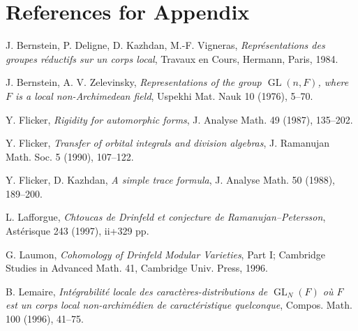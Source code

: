 \documentclass[10pt]{article}
\newcommand{\GL}{\operatorname{GL}}
\theoremstyle{deligne}
\begin{document}
\section*{References for Appendix}
\begin{description}[leftmargin=2.7em,labelwidth=2.4em,style=nextline]
\item[{[BDKV]}] J. Bernstein, P. Deligne, D. Kazhdan, M.-F. Vigneras, \emph{Représentations des groupes réductifs sur un corps local}, Travaux en Cours, Hermann, Paris, 1984.
\item[{[BZ]}] J. Bernstein, A. V. Zelevinsky, \emph{Representations of the group $\GL(n,F)$, where $F$ is a local non-Archimedean field}, Uspekhi Mat. Nauk 10 (1976), 5--70.
\item[{[F1]}] Y. Flicker, \emph{Rigidity for automorphic forms}, J. Analyse Math. 49 (1987), 135--202.
\item[{[F2]}] Y. Flicker, \emph{Transfer of orbital integrals and division algebras}, J. Ramanujan Math. Soc. 5 (1990), 107--122.
\item[{[FK]}] Y. Flicker, D. Kazhdan, \emph{A simple trace formula}, J. Analyse Math. 50 (1988), 189--200.
\item[{[Laf]}] L. Lafforgue, \emph{Chtoucas de Drinfeld et conjecture de Ramanujan--Petersson}, Astérisque 243 (1997), ii+329 pp.
\item[{[Lau]}] G. Laumon, \emph{Cohomology of Drinfeld Modular Varieties}, Part I; Cambridge Studies in Advanced Math. 41, Cambridge Univ. Press, 1996.
\item[{[Le]}] B. Lemaire, \emph{Intégrabilité locale des caractères-distributions de $\GL_N(F)$ où $F$ est un corps local non-archimédien de caractéristique quelconque}, Compos. Math. 100 (1996), 41--75.
\end{description}
\end{document}
